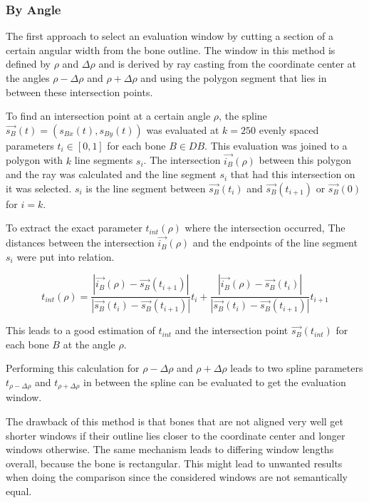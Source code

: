 \documentclass[pdftex,12pt,a4paper]{report}
\begin{document}
\subsubsection{By Angle}
\label{subsub:windowbyangle}

The first approach to select an evaluation window by cutting a section of a certain angular
width from the bone outline. The window in this method is defined by $\rho$ and $\Delta\rho$
and is derived by ray casting from the coordinate center at the angles $\rho - \Delta\rho$ and 
$\rho + \Delta\rho$ and using the polygon segment that lies in between these intersection points. 

To find an intersection point at a certain angle $\rho$, the spline $\vec{s_B}(t) = (s_{Bx}(t), s_{By}(t))$ was evaluated at $k=250$ evenly spaced
parameters $t_i \in [0,1]$ for each bone $B \in DB$. This evaluation was joined to a polygon
with $k$ line segments $s_i$. The intersection $\vec{i_B}(\rho)$ between this polygon and the ray was calculated and
the line segment $s_i$ that had this intersection on it was selected. $s_i$ is the line
segment between $\vec{s_B}(t_i)$ and $\vec{s_B}(t_{i+1})$ or $\vec{s_B}(0)$ for $i=k$.

To extract the exact parameter $t_{int}(\rho)$ where the intersection occurred, The distances
between the intersection $\vec{i_B}(\rho)$ and the endpoints of the line segment $s_i$ were put into relation.

\begin{equation}
t_{int}(\rho) =
\frac{|\vec{i_B}(\rho) - \vec{s_B}(t_{i+1})|}{|\vec{s_B}(t_i) - \vec{s_B}(t_{i+1})|} t_i +
\frac{|\vec{i_B}(\rho) - \vec{s_B}(t_i)|}{|\vec{s_B}(t_i) - \vec{s_B}(t_{i+1})|} t_{i+1}
\end{equation}

This leads to a good estimation of $t_{int}$ and the intersection point $\vec{s_B}(t_{int})$
for each bone $B$ at the angle $\rho$.

Performing this calculation for $\rho-\Delta\rho$ and $\rho+\Delta\rho$ leads to two spline
parameters $t_{\rho-\Delta\rho}$ and $t_{\rho+\Delta\rho}$ in between the spline can be 
evaluated to get the evaluation window.

The drawback of this method is that bones that are not aligned very well get shorter windows
if their outline lies closer to the coordinate center and longer windows otherwise. The same mechanism leads to differing window lengths overall, because the bone is rectangular. This 
might lead to unwanted results when doing the comparison since the considered windows are
not semantically equal. 
\end{document}
